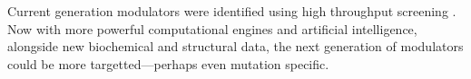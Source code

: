Current generation modulators were identified using high throughput screening \cite{vangoor2009}. Now with more powerful computational engines and artificial intelligence, alongside new biochemical and structural data, the next generation of modulators could be more targetted---perhaps even mutation specific.


